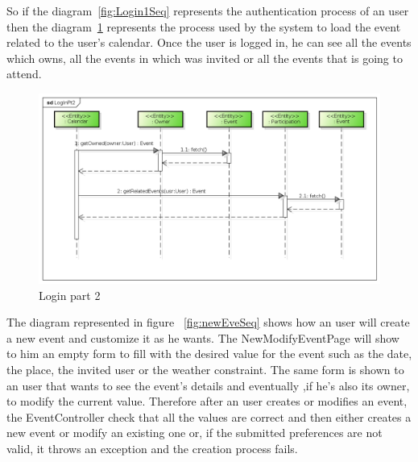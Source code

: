      \begin{center}
So if the diagram~\ref{fig:Login1Seq} represents the authentication process of an user then the diagram~\ref{fig:Login2Seq} represents the process used by the system to load the event related to the user's calendar. Once the user is logged in, he can see all the events which owns, all the events in which was invited or all the events that is going to attend. 
 \begin{figure}[H]
    \includegraphics[width=1\textwidth]{./BCEDiagram/BCE/EntityOverview/LogInPt2.png}
    \caption{Login part 2}
     \label{fig:Login2Seq}
     \end{figure}
   \end{center} 
 The diagram represented in figure ~\ref{fig:newEveSeq} shows how an user will create a new event and customize it as he wants. The NewModifyEventPage will show to him an empty form to fill with the desired value for the event such as the date, the place, the invited user or the weather constraint. The same form is shown to an user that wants to see the event's details and eventually ,if he's also its owner, to modify the current value.
Therefore after an user creates or modifies an event, the EventController check that all the values are correct and then either creates a new event or modify an existing one or, if the submitted preferences are not valid, it throws an exception and the creation process fails.  
